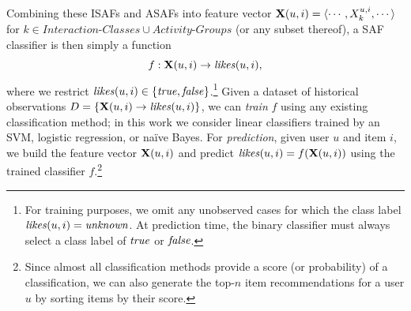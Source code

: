 

Combining these ISAFs and ASAFs into 
feature vector $\x(u,i) = \langle
\cdots,X^{u,i}_{k},\cdots \rangle$ for 
$k \in \textit{Interaction-Classes} \cup \textit{Activity-Groups}$
(or any subset thereof), a SAF classifier is then simply a function
\begin{equation*}
f: \x(u,i) \to \likes(u,i),
\end{equation*}
where we restrict $\likes(u,i) \in \{ \true, \false \}$.\footnote{For
  training purposes, we omit any unobserved cases for which the class
  label $\likes(u,i)=\unknown$.  At prediction time, the binary
  classifier must always select a class label of $\true$ or $\false$.}  
Given a dataset of historical
observations $D = \{ \x(u,i) \to \likes(u,i) \}$, we can \emph{train} $f$
using any existing classification method; 
in this work we consider linear classifiers
trained by an SVM, logistic regression, or na\"{i}ve
Bayes.  For \emph{prediction}, given user $u$ and
item $i$, we build the feature vector $\x(u,i)$ and 
predict $\likes(u,i) = f(\x(u,i))$ using the trained
classifier $f$.\footnote{Since almost all classification
methods provide a score (or probability) of a classification, we
can also generate the top-$n$ item recommendations for a user $u$ by
sorting items by their score.}

